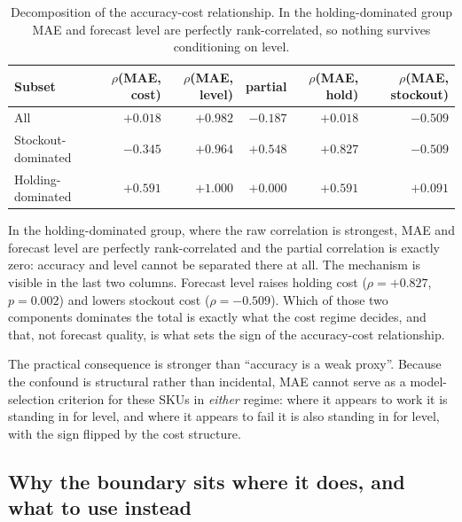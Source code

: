 \documentclass[11pt]{article}
\begin{document}
\begin{table}[htbp]
\centering
\caption{Decomposition of the accuracy-cost relationship. In the
holding-dominated group MAE and forecast level are perfectly rank-correlated,
so nothing survives conditioning on level.}
\label{tab:mech}
\small
\begin{tabular}{lrrrrr}
\toprule
Subset & $\rho$(MAE, cost) & $\rho$(MAE, level) & partial & $\rho$(MAE, hold) & $\rho$(MAE, stockout) \\
\midrule
All                & $+0.018$ & $+0.982$ & $-0.187$ & $+0.018$ & $-0.509$ \\
Stockout-dominated & $-0.345$ & $+0.964$ & $+0.548$ & $+0.827$ & $-0.509$ \\
Holding-dominated  & $+0.591$ & $\mathbf{+1.000}$ & $\mathbf{+0.000}$ & $+0.591$ & $+0.091$ \\
\bottomrule
\end{tabular}
\end{table}

In the holding-dominated group, where the raw correlation is strongest, MAE and
forecast level are perfectly rank-correlated and the partial correlation is
exactly zero: accuracy and level cannot be separated there at all. The
mechanism is visible in the last two columns. Forecast level raises holding
cost ($\rho = +0.827$, $p = 0.002$) and lowers stockout cost ($\rho = -0.509$).
Which of those two components dominates the total is exactly what the cost
regime decides, and that, not forecast quality, is what sets the sign of the
accuracy-cost relationship.

The practical consequence is stronger than ``accuracy is a weak proxy''.
Because the confound is structural rather than incidental, MAE cannot serve as
a model-selection criterion for these SKUs in \emph{either} regime: where it
appears to work it is standing in for level, and where it appears to fail it is
also standing in for level, with the sign flipped by the cost structure.

\subsection{Why the boundary sits where it does, and what to use instead}
\end{document}
